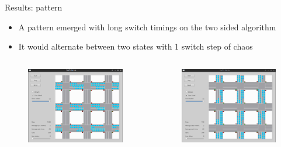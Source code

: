 \documentclass[11pt]{beamer}
\begin{document}
\begin{frame}{Results: pattern}
\begin{itemize}
 \item A pattern emerged with long switch timings on the two sided algorithm
 \item It would alternate between two states with 1 switch step of chaos
\end{itemize}
\begin{columns}
    \begin{column}{.5\textwidth}
        \begin{figure}
        \centering
        \includegraphics[width=\textwidth]{horizontal.png}
        \end{figure}
    \end{column}
    \begin{column}{.5\textwidth}
        \begin{figure}
        \centering
        \includegraphics[width=\textwidth]{vertical.png}
        \end{figure}
    \end{column}
\end{columns}

\end{frame}
\end{document}
